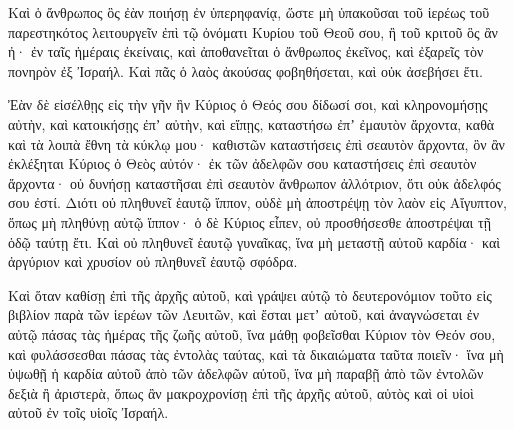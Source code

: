 {\par }{\PP {}Καὶ ὁ ἄνθρωπος ὃς ἐὰν ποιήσῃ ἐν ὑπερηφανίᾳ, ὥστε μὴ ὑπακοῦσαι τοῦ ἱερέως τοῦ παρεστηκότος λειτουργεῖν ἐπὶ τῷ ὀνόματι Κυρίου τοῦ Θεοῦ σου, ἢ τοῦ κριτοῦ ὃς ἂν ἠ· ἐν ταῖς ἡμέραις ἐκείναις, καὶ ἀποθανεῖται ὁ ἄνθρωπος ἐκεῖνος, καὶ ἐξαρεῖς τὸν πονηρὸν ἐξ Ἰσραήλ.
Καὶ πᾶς ὁ λαὸς ἀκούσας φοβηθήσεται, καὶ οὐκ ἀσεβήσει ἔτι.
\par }{\PP {}Ἐὰν δὲ εἰσέλθῃς εἰς τὴν γῆν ἣν Κύριος ὁ Θεός σου δίδωσί σοι, καὶ κληρονομήσῃς αὐτὴν, καὶ κατοικήσῃς ἐπʼ αὐτὴν, καὶ εἴπῃς, καταστήσω ἐπʼ ἐμαυτὸν ἄρχοντα, καθὰ καὶ τὰ λοιπὰ ἔθνη τὰ κύκλῳ μου·
καθιστῶν καταστήσεις ἐπὶ σεαυτὸν ἄρχοντα, ὃν ἂν ἐκλέξηται Κύριος ὁ Θεὸς αὐτόν· ἐκ τῶν ἀδελφῶν σου καταστήσεις ἐπὶ σεαυτὸν ἄρχοντα· οὐ δυνήσῃ καταστῆσαι ἐπὶ σεαυτὸν ἄνθρωπον ἀλλότριον, ὅτι οὐκ ἀδελφός σου ἐστί.
Διότι οὐ πληθυνεῖ ἑαυτῷ ἵππον, οὐδὲ μὴ ἀποστρέψῃ τὸν λαὸν εἰς Αἴγυπτον, ὅπως μὴ πληθύνῃ αὑτῷ ἵππον· ὁ δὲ Κύριος εἶπεν, οὐ προσθήσεσθε ἀποστρέψαι τῇ ὁδῷ ταύτῃ ἔτι.
Καὶ οὐ πληθυνεῖ ἑαυτῷ γυναῖκας, ἵνα μὴ μεταστῇ αὐτοῦ καρδία· καὶ ἀργύριον καὶ χρυσίον οὐ πληθυνεῖ ἑαυτῷ σφόδρα.
\par }{\PP {}Καὶ ὅταν καθίσῃ ἐπὶ τῆς ἀρχῆς αὐτοῦ, καὶ γράψει αὑτῷ τὸ δευτερονόμιον τοῦτο εἰς βιβλίον παρὰ τῶν ἱερέων τῶν Λευιτῶν,
καὶ ἔσται μετʼ αὐτοῦ, καὶ ἀναγνώσεται ἐν αὐτῷ πάσας τὰς ἡμέρας τῆς ζωῆς αὐτοῦ, ἵνα μάθῃ φοβεῖσθαι Κύριον τὸν Θεόν σου, καὶ φυλάσσεσθαι πάσας τὰς ἐντολὰς ταύτας, καὶ τὰ δικαιώματα ταῦτα ποιεῖν·
ἵνα μὴ ὑψωθῇ ἡ καρδία αὐτοῦ ἀπὸ τῶν ἀδελφῶν αὐτοῦ, ἵνα μὴ παραβῇ ἀπὸ τῶν ἐντολῶν δεξιὰ ἢ ἀριστερὰ, ὅπως ἂν μακροχρονίσῃ ἐπὶ τῆς ἀρχῆς αὐτοῦ, αὐτὸς καὶ οἱ υἱοὶ αὐτοῦ ἐν τοῖς υἱοῖς Ἰσραήλ.

}
